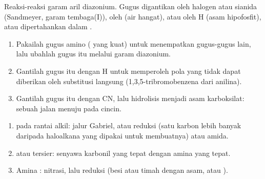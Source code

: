 \begin{omfigure}

{\small Reaksi-reaksi garam aril diazonium. Gugus  digantikan oleh
halogen atau sianida (Sandmeyer, garam tembaga(I)), oleh  (air
hangat), atau oleh H (asam hipofosfit), atau dipertahankan dalam .}
\end{omfigure}

\begin{method}\label{met:b2:amines:diazonium-routes}
\begin{enumerate}
  \item Pakailah gugus amino ( yang kuat) untuk
        menempatkan gugus-gugus lain, lalu ubahlah gugus itu melalui garam
        diazonium.
  \item Gantilah gugus itu dengan H untuk memperoleh pola yang tidak dapat
        diberikan oleh substitusi langsung (1,3,5-tribromobenzena dari anilina).
  \item Gantilah gugus itu dengan CN, lalu hidrolisis menjadi asam
        karboksilat: sebuah jalan menuju  pada cincin.
\end{enumerate}
\end{method}

\begin{method}\label{met:b2:amines:make-amine}
\begin{enumerate}
  \item {} pada rantai alkil: jalur Gabriel, atau reduksi 
        (satu karbon lebih banyak daripada haloalkana yang dipakai untuk
        membuatnya) atau amida.
  \item {} atau tersier:  senyawa karbonil yang
        tepat dengan amina yang tepat.
  \item Amina : nitrasi, lalu reduksi (besi atau timah dengan asam,
        atau ).
\end{enumerate}
\end{method}

